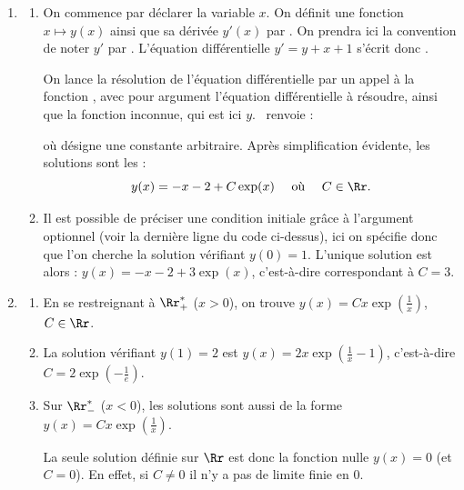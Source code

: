 \documentclass[class=report,crop=false]{standalone}
\begin{document}
\begin{enumerate}
  \item  
  
  \begin{enumerate}
  \item 
On commence par déclarer la variable $x$. 
On définit une fonction $x \mapsto y(x)$ ainsi que sa dérivée $y'(x)$ 
par . 
On prendra ici la convention de noter $y'$ par .
L'équation différentielle $y' = y + x + 1$
s'écrit donc .


On lance la résolution de l'équation différentielle par un appel à la fonction  
, avec pour argument 
l'équation différentielle à résoudre, ainsi que la fonction inconnue, qui est ici $y$. 
\Sage\ renvoie :\\
\centerline{}
où  désigne une constante arbitraire.
Après simplification évidente, les solutions sont les :
$$y(x) = -x-2 + C \exp(x) \quad \text{ où } \quad C \in \Rr.$$

    \item Il est possible de préciser une condition 
initiale grâce à l'argument optionnel  
(voir la dernière ligne du code ci-dessus), ici on 
spécifie donc que l'on cherche la solution vérifiant $y(0)=1$.
L'unique solution est alors : $y(x) = -x-2 + 3\exp(x)$, c'est-à-dire correspondant à $C=3$.

  \end{enumerate}

  \item 
  \begin{enumerate}
    \item En se restreignant à $\Rr_+^*$ ($x>0$), on trouve $y(x) = Cx \exp(\frac1x)$, $C\in \Rr$.
    
    \item La solution vérifiant $y(1)=2$ est $y(x) = 2x \exp(\frac1x - 1)$,
    c'est-à-dire $C = 2 \exp(-\frac1e)$.
    
    \item Sur $\Rr_-^*$ ($x<0$), les solutions sont aussi de la forme $y(x) = Cx \exp(\frac1x)$.

    La seule solution définie sur $\Rr$ est donc la fonction nulle $y(x) = 0$ (et $C=0$). 
    En effet, si $C \neq 0$ il n'y a pas de limite finie en $0$.
  \end{enumerate}
  

\end{enumerate}
\end{document}

